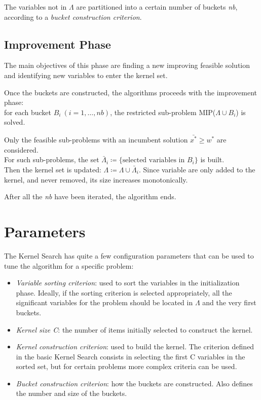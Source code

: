 The variables not in \(\Lambda\) are partitioned into a certain number of buckets \textit{nb}, according
to a \textit{bucket construction criterion}.

\subsection{Improvement Phase}
The main objectives of this phase are finding a new improving feasible solution and identifying new variables
to enter the kernel set.

Once the buckets are constructed, the algorithms proceeds with the improvement phase:\\
for each bucket \(B_{i} \ (i=1,\dots,nb)\),
the restricted sub-problem MIP(\(\Lambda \cup B_{i}\)) is solved.

Only the feasible sub-problems with an incumbent solution \(\bar{x^{*}} \geq w^{*}\) are considered.\\
For such sub-problems, the set \(\bar{\Lambda}_{i} \coloneqq \{\text{selected variables in } B_{i}\}\) is built.\\
Then the kernel set is updated: \(\Lambda \coloneqq \Lambda \cup \bar{\Lambda}_{i}\).
Since variable are only added to the kernel, and never removed, its size increases monotonically.

After all the \textit{nb} have been iterated, the algorithm ends.


\section{Parameters}
The Kernel Search has quite a few configuration parameters that can be used to tune the algorithm for a specific
problem:
\begin{itemize}
    \item \textit{Variable sorting criterion}: used to sort the variables in the initialization phase.
    Ideally, if the sorting criterion is selected appropriately,
    all the significant variables for the problem should be located in \(\Lambda\) and the very first buckets.
    \item \textit{Kernel size C}: the number of items initially selected to construct the kernel.
    \item \textit{Kernel construction criterion}: used to build the kernel.
    The criterion defined in the basic Kernel Search consists in selecting
    the first C variables in the sorted set, but for certain problems more complex criteria can be used.
    \item \textit{Bucket construction criterion}: how the buckets are constructed.
    Also defines the number and size of the buckets.
\end{itemize}


